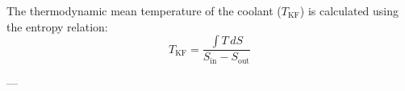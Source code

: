 The thermodynamic mean temperature of the coolant (\( T_{\text{KF}} \)) is calculated using the entropy relation:  
\[
T_{\text{KF}} = \frac{\int T \, dS}{S_{\text{in}} - S_{\text{out}}}
\]  

---